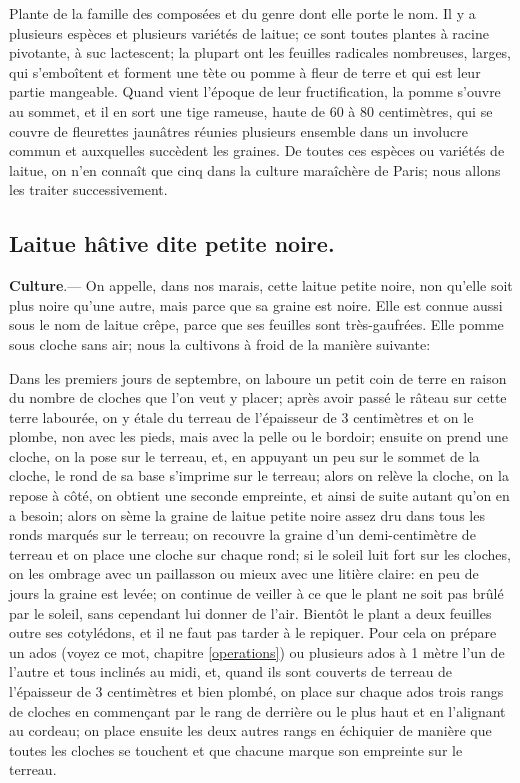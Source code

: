 \documentclass[10pt,a4paper]{book}
\begin{document}
Plante de la famille des composées et du genre dont elle porte le nom. Il y a plusieurs espèces et plusieurs variétés de laitue; ce sont toutes plantes à racine pivotante, à suc lactescent; la plupart ont les feuilles radicales nombreuses, larges, qui s'emboîtent et forment une tète ou pomme à fleur de terre et qui est leur partie mangeable. Quand vient l'époque de leur fructification, la pomme s'ouvre au sommet, et il en sort une tige rameuse, haute de 60 à 80 centimètres, qui se couvre de fleurettes jaunâtres réunies plusieurs ensemble dans un involucre commun et auxquelles succèdent les graines. De toutes ces espèces ou variétés de laitue, on n'en connaît que cinq dans la culture maraîchère de Paris; nous allons les traiter successivement.

\subsection{Laitue hâtive dite petite noire.}

\textbf{Culture}.--- On appelle, dans nos marais, cette laitue petite noire, non qu'elle soit plus noire qu'une autre, mais parce que sa graine est noire. Elle est connue aussi sous le nom de laitue crêpe, parce que ses feuilles sont très-gaufrées. Elle pomme sous cloche sans air; nous la cultivons à froid de la manière suivante:

Dans les premiers jours de septembre, on laboure un petit coin de terre en raison du nombre de cloches que l'on veut y placer; après avoir passé le râteau sur cette terre labourée, on y étale du terreau de l'épaisseur de 3 centimètres et on le plombe, non avec les pieds, mais avec la pelle ou le bordoir; ensuite on prend une cloche, on la pose sur le terreau, et, en appuyant un peu sur le sommet de la cloche, le rond de sa base s'imprime sur le terreau; alors on relève la cloche, on la repose à côté, on obtient une seconde empreinte, et ainsi de suite autant qu'on en a besoin; alors on sème la graine de laitue petite noire assez dru dans tous les ronds marqués sur le terreau; on recouvre la graine d'un demi-centimètre de terreau et on place une cloche sur chaque rond; si le soleil luit fort sur les cloches, on les ombrage avec un paillasson ou mieux avec une litière claire: en peu de jours la graine est levée; on continue de veiller à ce que le plant ne soit pas brûlé par le soleil, sans cependant lui donner de l'air. Bientôt le plant a deux feuilles outre ses cotylédons, et il ne faut pas tarder à le repiquer. Pour cela on prépare un ados (voyez ce mot, chapitre \ref{operations}) ou plusieurs ados à 1 mètre l'un de l'autre et tous inclinés au midi, et, quand ils sont couverts de terreau de l'épaisseur de 3 centimètres et bien plombé, on place sur chaque ados trois rangs de cloches en commençant par le rang de derrière ou le plus haut et en l'alignant au cordeau; on place ensuite les deux autres rangs en échiquier de manière que toutes les cloches se touchent et que chacune marque son empreinte sur le terreau.
\end{document}
